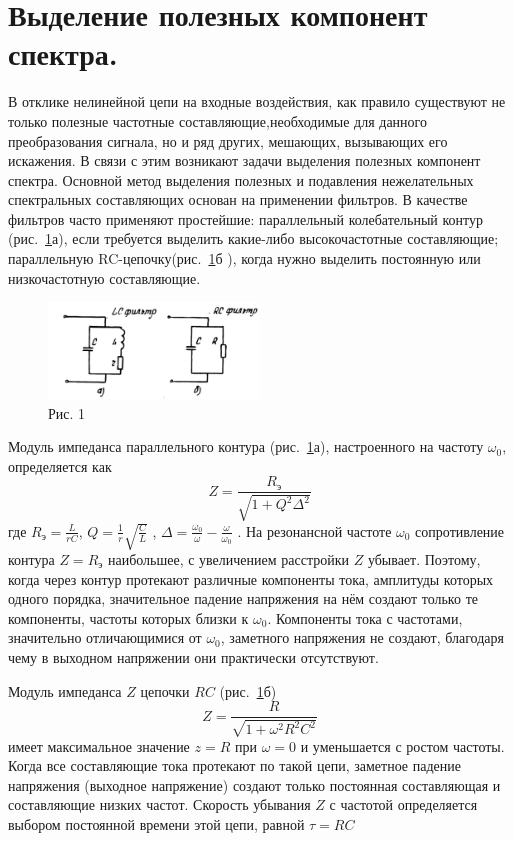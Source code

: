 \section{Выделение полезных компонент спектра.}
В отклике нелинейной цепи на входные воздействия, как правило существуют не только полезные частотные составляющие,необходимые для данного преобразования сигнала, но и ряд других, мешающих, вызывающих его искажения. В связи с этим возникают задачи выделения полезных компонент спектра. Основной метод выделения полезных и подавления нежелательных спектральных составляющих основан на применении фильтров. В качестве фильтров часто
применяют простейшие: параллельный колебательный контур (рис.~\ref{pic:6}а), если требуется выделить какие-либо высокочастотные составляющие; параллельную RC-цепочку(рис.~\ref{pic:6}б ), когда нужно выделить постоянную или низкочастотную составляющие.
\begin{figure}
	\begin{center}
		\vspace{-10pt}
		\includegraphics[width=0.5\textwidth]{picture/pic6.jpg}
		\vspace{-40pt}
	\end{center}
	\caption*{Рис. 1}
	\label{pic:6}
\end{figure}

Модуль импеданса параллельного контура (рис.~\ref{pic:6}а), настроенного на частоту $\omega_0$, определяется как
$$ Z=\frac{R_{\text{э}}}{\sqrt{1+Q^2\Delta^2}} $$
где $ R_{\text{э}} = \frac{L}{rC} $, $ Q = \frac{1}{r}\sqrt{\frac{C}{L}} $ , $ \Delta = \frac{\omega_0}{\omega}-\frac{\omega}{\omega_0} $ . На резонансной частоте $\omega_0$ сопротивление контура $Z = R_{\text{э}}$ наибольшее, с увеличением расстройки $Z$ убывает. Поэтому, когда через контур протекают различные компоненты тока, амплитуды которых одного порядка, значительное падение напряжения на нём создают только те компоненты, частоты которых близки к $\omega_0$. Компоненты тока с частотами, значительно отличающимися от
$\omega_0$, заметного напряжения не создают, благодаря чему в выходном напряжении они практически отсутствуют.

Модуль импеданса $Z$ цепочки $RC$ (рис.~\ref{pic:6}б)
$$ Z=\frac{R}{\sqrt{1+\omega^2R^2C^2}} $$
имеет максимальное значение $z = R$ при $\omega = 0$ и уменьшается с ростом частоты. Когда все составляющие тока протекают по такой цепи, заметное падение напряжения (выходное напряжение) создают только постоянная составляющая и составляющие низких частот. Скорость убывания $Z$ с частотой определяется выбором постоянной времени этой цепи, равной $\tau = RC$
